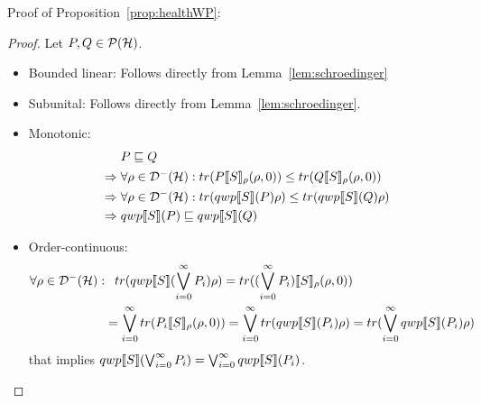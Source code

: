 \documentclass[a4paper,UKenglish,cleveref, autoref, thm-restate]{lipics-v2021}
\begin{document}
Proof of Proposition~\ref{prop:healthWP}:
\begin{proof}Let $P,Q \in \mathcal{P}(\mathcal{H})$.
    \begin{itemize}
        \item Bounded linear: Follows directly from Lemma~\ref{lem:schroedinger}
        \item Subunital: Follows directly from Lemma~\ref{lem:schroedinger}.
        \item Monotonic:
        \begin{align*}
            &\phantom{\Rightarrow.}P\sqsubseteq Q \\
            &\Rightarrow \forall \rho \in \mathcal{D}^- (\mathcal{H}): tr(P \llbracket S \rrbracket_{\rho}(\rho,0)) \leq tr(Q \llbracket S \rrbracket_{\rho}(\rho,0))\\
            &\Rightarrow  \forall \rho \in \mathcal{D}^- (\mathcal{H}): tr(qwp\llbracket S \rrbracket (P) \rho) \leq tr(qwp\llbracket S \rrbracket (Q)\rho)\\
            &\Rightarrow  qwp\llbracket S \rrbracket (P) \sqsubseteq qwp\llbracket S \rrbracket (Q)
        \end{align*}
        \item Order-continuous:
        \begin{align*}
            \forall \rho \in \mathcal{D}^- (\mathcal{H}): &\phantom{=}tr(qwp\llbracket S \rrbracket (\bigvee_{i=0}^\infty P_i) \rho)= tr((\bigvee_{i=0}^\infty P_i) \llbracket S \rrbracket_{\rho}(\rho,0))\\
            &= \bigvee_{i=0}^\infty tr(P_i \llbracket S \rrbracket_{\rho}(\rho,0))= \bigvee_{i=0}^\infty tr(qwp\llbracket S \rrbracket (P_i)\rho)=  tr(\bigvee_{i=0}^\infty qwp\llbracket S \rrbracket (P_i)\rho)
        \end{align*}
        that implies $qwp\llbracket S \rrbracket (\bigvee_{i=0}^\infty P_i) = \bigvee_{i=0}^\infty qwp\llbracket S \rrbracket (P_i)$.
    \end{itemize}
\end{proof}
\end{document}
